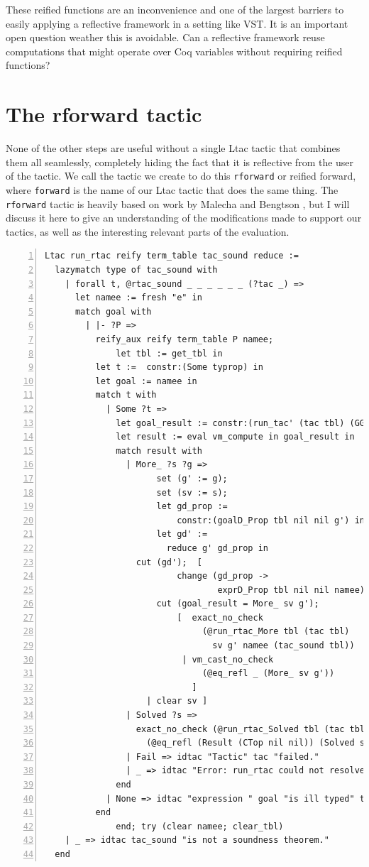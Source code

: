 \documentclass{puthesis}
\begin{document}
These reified functions are an inconvenience and one of the largest
barriers to easily applying a reflective framework in a setting like
VST. It is an important open question weather this is avoidable. Can
a reflective framework reuse computations that might operate
over Coq variables without requiring reified functions? 

\section{The rforward tactic}

None of the other steps are useful without a single Ltac tactic that
combines them all seamlessly, completely hiding the fact that it is
reflective from the user of the tactic. We call the tactic we create
to do this \lstinline|rforward| or reified forward, where
\lstinline|forward| is the name of our Ltac tactic that does the same
thing. The \lstinline|rforward| tactic is heavily based on work by
Malecha and Bengtson \cite{}, but I will discuss it here to give an
understanding of the modifications made to support our tactics, as well
as the interesting relevant parts of the evaluation. 

\begin{lstlisting}[numbers=left]
Ltac run_rtac reify term_table tac_sound reduce :=
  lazymatch type of tac_sound with
    | forall t, @rtac_sound _ _ _ _ _ _ (?tac _) =>
	  let namee := fresh "e" in
	  match goal with
	    | |- ?P => 
	      reify_aux reify term_table P namee;
              let tbl := get_tbl in
	      let t :=  constr:(Some typrop) in
	      let goal := namee in
	      match t with
	        | Some ?t =>
	          let goal_result := constr:(run_tac' (tac tbl) (GGoal namee)) in
	          let result := eval vm_compute in goal_result in
	          match result with
	            | More_ ?s ?g =>
                      set (g' := g);
                      set (sv := s);
                      let gd_prop := 
                          constr:(goalD_Prop tbl nil nil g') in
                      let gd' := 
                        reduce g' gd_prop in
	              cut (gd');  [ 
                          change (gd_prop -> 
                                  exprD_Prop tbl nil nil namee);
	                  cut (goal_result = More_ sv g');
                          [  exact_no_check
                               (@run_rtac_More tbl (tac tbl) 
                                 sv g' namee (tac_sound tbl))
                           | vm_cast_no_check 
                               (@eq_refl _ (More_ sv g'))
                             ] 
	                | clear sv ]
	            | Solved ?s =>
	              exact_no_check (@run_rtac_Solved tbl (tac tbl) s namee (tac_sound tbl) 
	                (@eq_refl (Result (CTop nil nil)) (Solved s) <: run_tac' (tac tbl) (GGoal goal) = Solved s))
	            | Fail => idtac "Tactic" tac "failed."
	            | _ => idtac "Error: run_rtac could not resolve the result from the tactic :" tac
	          end
	        | None => idtac "expression " goal "is ill typed" t
	      end
              end; try (clear namee; clear_tbl)
	| _ => idtac tac_sound "is not a soundness theorem."
  end
\end{lstlisting}
\end{document}
